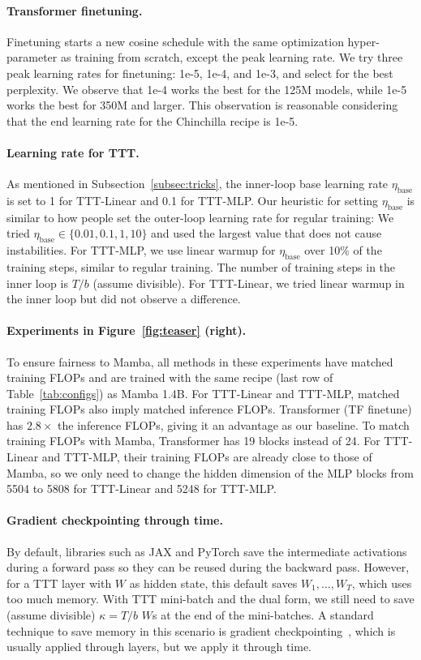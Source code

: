 \documentclass{article}
\begin{document}
\paragraph{Transformer finetuning.}
Finetuning starts a new cosine schedule with the same optimization hyper-parameter as training from scratch, except the peak learning rate.
We try three peak learning rates for finetuning: 1e-5, 1e-4, and 1e-3, and select for the best perplexity.
We observe that 1e-4 works the best for the 125M models, while 1e-5 works the best for 350M and larger.
This observation is reasonable considering that the end learning rate for the Chinchilla recipe is 1e-5.

\paragraph{Learning rate for TTT.}
As mentioned in Subsection~\ref{subsec:tricks}, the inner-loop base learning rate $\eta_\text{base}$ is set to 1 for TTT-Linear and 0.1 for TTT-MLP.
Our heuristic for setting $\eta_\text{base}$ is similar to how people set the outer-loop learning rate for regular training: We tried $\eta_\text{base} \in \{0.01, 0.1, 1, 10\}$ and used the largest value that does not cause instabilities.
For TTT-MLP, we use linear warmup for $\eta_\text{base}$ over 10\% of the training steps, similar to regular training. 
The number of training steps in the inner loop is $T / b$ (assume divisible).
For TTT-Linear, we tried linear warmup in the inner loop but did not observe a difference.

\paragraph{Experiments in Figure~\ref{fig:teaser} (right).} To ensure fairness to Mamba, all methods in these experiments have matched training FLOPs and are trained with the same recipe (last row of Table~\ref{tab:configs}) as Mamba 1.4B.
For TTT-Linear and TTT-MLP, matched training FLOPs also imply matched inference FLOPs.
Transformer (TF finetune) has $2.8\times$ the inference FLOPs, giving it an advantage as our baseline.
To match training FLOPs with Mamba, Transformer has 19 blocks instead of 24. 
For TTT-Linear and TTT-MLP, their training FLOPs are already close to those of Mamba, so we only need to change the hidden dimension of the MLP blocks from 5504 to 5808 for TTT-Linear and 5248 for TTT-MLP.

\paragraph{Gradient checkpointing through time.} 
By default, libraries such as JAX and PyTorch save the intermediate activations during a forward pass so they can be reused during the backward pass.
However, for a TTT layer with $W$ as hidden state, this default saves $W_1,\dots,W_T$, which uses too much memory.
With TTT mini-batch and the dual form, we still need to save (assume divisible) $\kappa = T/b$ $W$s at the end of the mini-batches.
A standard technique to save memory in this scenario is gradient checkpointing~\cite{chen2016training}, which is usually applied through layers, but we apply it through time.
\end{document}

